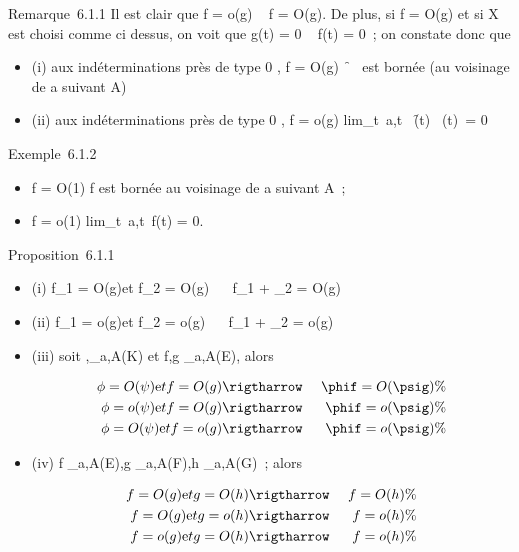 \documentclass[]{article}
\begin{document}
Remarque~6.1.1 Il est clair que f = o(g) \rigtharrow~ f = O(g). De plus, si f =
O(g) et si X est choisi comme ci dessus, on voit que g(t) = 0 \rigtharrow~ f(t) =
0~; on constate donc que

\begin{itemize}
\itemsep1pt\parskip0pt
\item
  (i) aux indéterminations près de type  0  ,
  f = O(g) \Leftrightarrow
  \f\
  \over
  \g\ est bornée (au
  voisinage de a suivant A)
\item
  (ii) aux indéterminations près de type  0  ,
  f = o(g) \Leftrightarrow
  lim_t\rightarrow~a,t\inA~
  \f(t)\
  \over
  \g(t)\ = 0
\end{itemize}

Exemple~6.1.2

\begin{itemize}
\itemsep1pt\parskip0pt
\item
  f = O(1) \Leftrightarrow f est bornée au voisinage de a
  suivant A~;
\item
  f = o(1) \Leftrightarrow
  lim_t\rightarrow~a,t\inA~f(t) = 0.
\end{itemize}

Proposition~6.1.1

\begin{itemize}
\item
  (i) f_1 = O(g)\text et f_2 = O(g)
  \rigtharrow~ \alpha~f_1 + \muf_2 = O(g)
\item
  (ii) f_1 = o(g)\text et f_2 =
  o(g) \rigtharrow~ \alpha~f_1 + \muf_2 = o(g)
\item
  (iii) soit \phi,\psi {}_a,A(K) et f,g \inℱ_a,A(E), alors

  \begin{align*} \phi = O(\psi)\text et
  f = O(g)& \rigtharrow~& \phif = O(\psig)\%& \\ \phi =
  o(\psi)\text et f = O(g)& \rigtharrow~& \phif = o(\psig) \%&
  \\ \phi = O(\psi)\text et f
  = o(g)& \rigtharrow~& \phif = o(\psig) \%& \\
  \end{align*}
\item
  (iv) f _a,A(E),g _a,A(F),h _a,A(G)~;
  alors

  \begin{align*} f = O(g)\text et
  g = O(h)& \rigtharrow~& f = O(h)\%& \\ f =
  O(g)\text et g = o(h)& \rigtharrow~& f = o(h) \%&
  \\ f = o(g)\text et g
  = O(h)& \rigtharrow~& f = o(h) \%& \\
  \end{align*}
\end{itemize}
\end{document}
